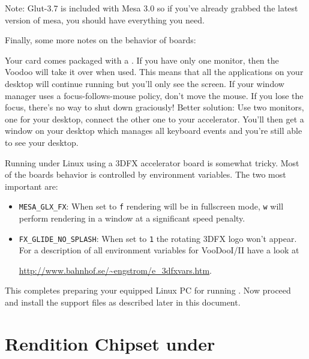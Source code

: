  \noindent
Note: Glut-3.7 is included with Mesa 3.0 so if you've already grabbed
the latest version of mesa, you should have everything you need.

Finally, some more notes on the behavior of  boards:

Your card comes packaged with a . If you
have only one monitor, then the Voodoo will take it over when
used. This means that all the applications on your desktop will
continue running but you'll only see the \FlightGear screen. If
your window manager uses a focus-follows-mouse policy, don't move
the mouse. If you lose the focus, there's no way to shut down
\FlightGear graciously! Better solution: Use two monitors, one for
your desktop, connect the other one to your accelerator. You'll
then get a window on your desktop which manages all keyboard
events and you're still able to see your desktop.

Running \FlightGear under Linux using a 3DFX accelerator board is
somewhat tricky. Most of the boards behavior is controlled by
environment variables. The two most
important are:

\begin{itemize}

\item{\texttt{MESA\_GLX\_FX}}: When set to \texttt{f} rendering will be in
  fullscreen mode,
  \texttt{w} will perform rendering in a window at a significant speed penalty.

\item {\texttt{FX\_GLIDE\_NO\_SPLASH}}:
  When set to \texttt{1} the rotating 3DFX logo
  won't appear. For a description of all environment
  variables for  VooDooI/II have a look at

\href{http://www.bahnhof.se/~engstrom/e_3dfxvars.htm}{http://www.bahnhof.se/\~{}engstrom/e\_3dfxvars.htm}.

\end{itemize}

This completes preparing your  equipped Linux PC for
running \FlightGear\hspace{-2mm}.
Now proceed and install the support files as described later in this document.

\section{Rendition Chipset under
 \label{renditionwin}}

